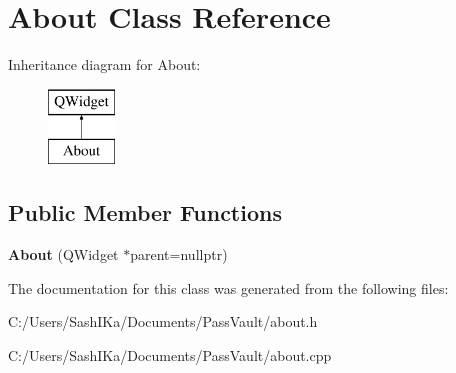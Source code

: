 \hypertarget{class_about}{}\section{About Class Reference}
\label{class_about}
Inheritance diagram for About\+:\begin{figure}[H]
\begin{center}
\leavevmode
\includegraphics[height=2.000000cm]{class_about}
\end{center}
\end{figure}
\subsection*{Public Member Functions}
\begin{DoxyCompactItemize}
\item 
\mbox{\label{class_about_a8df4f62d9fa24f1ec965416f3afd9b57}} 
{\bfseries About} (Q\+Widget $\ast$parent=nullptr)
\end{DoxyCompactItemize}


The documentation for this class was generated from the following files\+:\begin{DoxyCompactItemize}
\item 
C\+:/\+Users/\+Sash\+I\+Ka/\+Documents/\+Pass\+Vault/about.\+h\item 
C\+:/\+Users/\+Sash\+I\+Ka/\+Documents/\+Pass\+Vault/about.\+cpp\end{DoxyCompactItemize}
